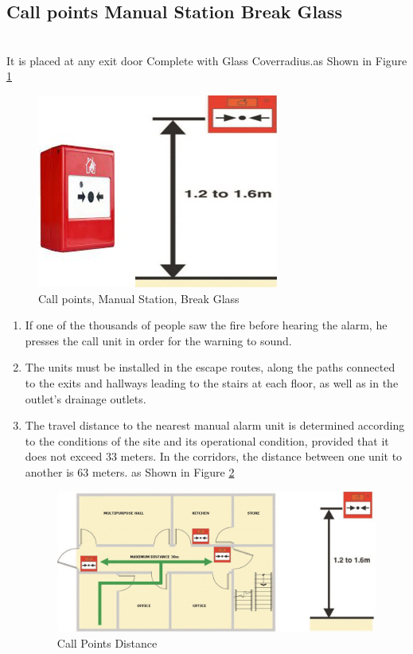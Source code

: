 \documentclass[12pt,fleqn]{book} %
\begin{document}
\begin{enumerate}
\begin{itemize}
\subsection{Call points Manual Station Break Glass}  
\\ It is placed at any exit door Complete with Glass Coverradius.as Shown in Figure \ref{fig:hamdy 33}
\begin{figure}[!h]
    \centering
    \includegraphics[width=0.5\linewidth]{hamdy 33.png}
    \caption{Call points, Manual Station, Break Glass}
    \label{fig:hamdy 33}
\end{figure}
\begin{enumerate}
    \item If one of the thousands of people saw the fire before hearing the alarm, he presses the call unit in order for the warning to sound.
    \item The units must be installed in the escape routes, along the paths connected to the exits and hallways leading to the stairs at each floor, as well as in the outlet's drainage outlets.
    \item The travel distance to the nearest manual alarm unit is determined according to the conditions of the site and its operational condition, provided that it does not exceed 33 meters. In the corridors, the distance between one unit to another is 63 meters. as Shown in Figure \ref{fig:hamdy 34}
    \begin{figure}[!h]
    \centering
    \includegraphics[width=0.8\linewidth]{hamdy 34.png}
    \caption{Call Points Distance}
    \label{fig:hamdy 34}
\end{figure}
\end{enumerate}
\end{itemize} %

\end{enumerate}
\end{document}
